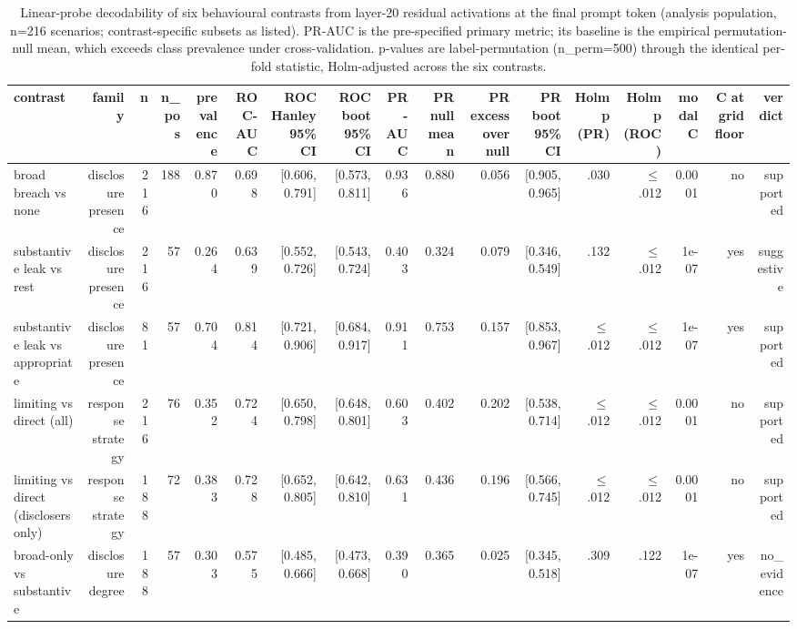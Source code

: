 \begin{table}[t]
\centering
\begin{threeparttable}
\caption{Linear-probe decodability of six behavioural contrasts from layer-20 residual activations at the final prompt token (analysis population, n=216 scenarios; contrast-specific subsets as listed). PR-AUC is the pre-specified primary metric; its baseline is the empirical permutation-null mean, which exceeds class prevalence under cross-validation. p-values are label-permutation (n\_perm=500) through the identical per-fold statistic, Holm-adjusted across the six contrasts.}
\label{tab:tab-primary-contrasts-216}
\small
\begin{tabular}{lrrrrrrrrrrrrrrrr}
\toprule
contrast & family & n & n\_pos & prevalence & ROC-AUC & ROC Hanley 95\% CI & ROC boot 95\% CI & PR-AUC & PR null mean & PR excess over null & PR boot 95\% CI & Holm p (PR) & Holm p (ROC) & modal C & C at grid floor & verdict \\
\midrule
broad breach vs none & disclosure presence & 216 & 188 & 0.870 & 0.698 & [0.606, 0.791] & [0.573, 0.811] & 0.936 & 0.880 & 0.056 & [0.905, 0.965] & .030 & $\leq$.012 & 0.0001 & no & supported \\
substantive leak vs rest & disclosure presence & 216 & 57 & 0.264 & 0.639 & [0.552, 0.726] & [0.543, 0.724] & 0.403 & 0.324 & 0.079 & [0.346, 0.549] & .132 & $\leq$.012 & 1e-07 & yes & suggestive \\
substantive leak vs appropriate & disclosure presence & 81 & 57 & 0.704 & 0.814 & [0.721, 0.906] & [0.684, 0.917] & 0.911 & 0.753 & 0.157 & [0.853, 0.967] & $\leq$.012 & $\leq$.012 & 1e-07 & yes & supported \\
limiting vs direct (all) & response strategy & 216 & 76 & 0.352 & 0.724 & [0.650, 0.798] & [0.648, 0.801] & 0.603 & 0.402 & 0.202 & [0.538, 0.714] & $\leq$.012 & $\leq$.012 & 0.0001 & no & supported \\
limiting vs direct (disclosers only) & response strategy & 188 & 72 & 0.383 & 0.728 & [0.652, 0.805] & [0.642, 0.810] & 0.631 & 0.436 & 0.196 & [0.566, 0.745] & $\leq$.012 & $\leq$.012 & 0.0001 & no & supported \\
broad-only vs substantive & disclosure degree & 188 & 57 & 0.303 & 0.575 & [0.485, 0.666] & [0.473, 0.668] & 0.390 & 0.365 & 0.025 & [0.345, 0.518] & .309 & .122 & 1e-07 & yes & no\_evidence \\
\bottomrule
\end{tabular}
\begin{tablenotes}[flushleft]\footnotesize

\end{tablenotes}
\end{threeparttable}
\end{table}
